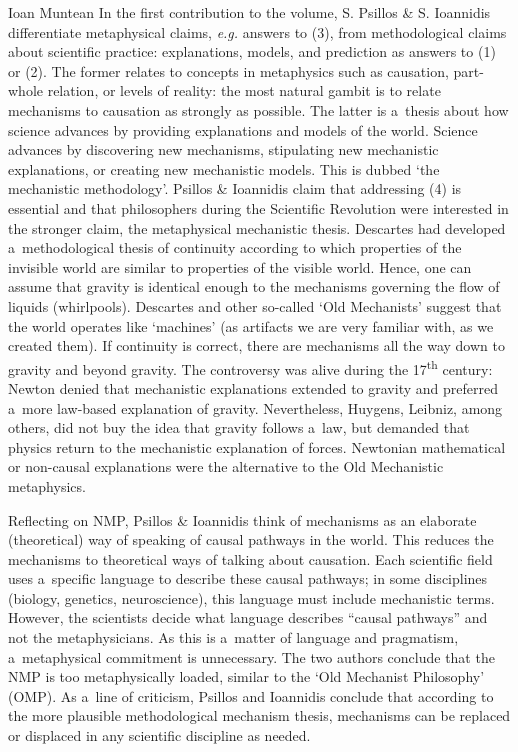 \begin{recengenv}{Ioan Muntean}
\enlargethispage{1.5\baselineskip}
In the first contribution to the volume, S. Psillos \& S. Ioannidis differentiate metaphysical claims, \textit{e.g.} answers to (3), from methodological claims about scientific practice: explanations, models, and prediction as answers to (1) or (2). The former relates to concepts in metaphysics such as causation, part-whole relation, or levels of reality: the most natural gambit is to relate mechanisms to causation as strongly as possible. The latter is a~thesis about how science advances by providing explanations and models of the world. Science advances by discovering new mechanisms, stipulating new mechanistic explanations, or creating new mechanistic models. This is dubbed ‘the mechanistic methodology'. Psillos \& Ioannidis claim that addressing (4) is essential and that philosophers during the Scientific Revolution were interested in the stronger claim, the metaphysical mechanistic thesis. Descartes had developed a~methodological thesis of continuity according to which properties of the invisible world are similar to properties of the visible world. Hence, one can assume that gravity is identical enough to the mechanisms governing the flow of liquids (whirlpools). Descartes and other so-called ‘Old Mechanists' suggest that the world operates like `machines' (as artifacts we are very familiar with, as we created them). If continuity is correct, there are mechanisms all the way down to gravity and beyond gravity. The controversy was alive during the 17\textsuperscript{th} century: Newton denied that mechanistic explanations extended to gravity and preferred a~more law-based explanation of gravity. Nevertheless, Huygens, Leibniz, among others, did not buy the idea that gravity follows a~law, but demanded that physics return to  the mechanistic explanation of forces. Newtonian mathematical or non-causal explanations were the alternative to the Old Mechanistic metaphysics.

Reflecting on NMP, Psillos \& Ioannidis think of mechanisms as an elaborate (theoretical) way of speaking of causal pathways in the world. This reduces the mechanisms to theoretical ways of talking about causation. Each scientific field uses a~specific language to describe these causal pathways; in some disciplines (biology, genetics, neuroscience), this language must include mechanistic terms. However, the scientists decide what language describes ``causal pathways'' and not the metaphysicians. As this is a~matter of language and pragmatism, a~metaphysical commitment is unnecessary. The two authors conclude that the NMP is too metaphysically loaded, similar to the ‘Old Mechanist Philosophy' (OMP). As a~line of criticism, Psillos and Ioannidis conclude that according to the more plausible methodological mechanism thesis, mechanisms can be replaced or displaced in any scientific discipline as needed.


\end{recengenv}
